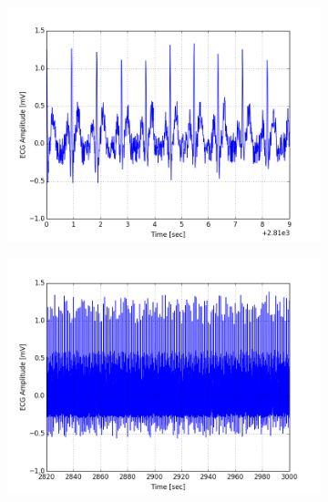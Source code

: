 \documentclass[paper=a4, fontsize=11pt]{scrartcl}
\numberwithin{equation}{section}		%
\numberwithin{figure}{section}			%
\numberwithin{table}{section}		    %
\begin{document}
\begin{appendices}
\begin{figure}[H]
	\centering
	\begin{subfigure}[b]{0.3\textwidth}
		\includegraphics[width=\textwidth]{sim/ecg_52}
	\end{subfigure}
	\begin{subfigure}[b]{0.3\textwidth}
		\includegraphics[width=\textwidth]{sim/ecg_53}
	\end{subfigure}
	\begin{subfigure}[b]{0.3\textwidth}

\end{subfigure}
\end{figure}
\end{appendices}
\end{document}
